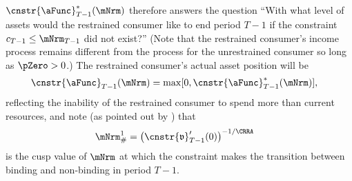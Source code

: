 \documentclass[\econtexRoot/BufferStockTheory]{subfiles}
\begin{document}
$\cnstr{\aFunc}_{T-1}^{*}(\mNrm)$ therefore answers the question ``With what level of assets would the restrained consumer like to end period $T-1$ if the constraint $c_{T-1} \leq \mNrm_{T-1}$ did not exist?''  (Note that the restrained consumer's income process remains different from the process for the unrestrained consumer so long as $\pZero>0$.)  The restrained consumer's actual asset position will be
\begin{equation}\begin{gathered}\begin{aligned}
      \cnstr{\aFunc}_{T-1}(\mNrm)  & = \max[0,\cnstr{\aFunc}^{*}_{T-1}(\mNrm)], \notag
    \end{aligned}\end{gathered}\end{equation}
reflecting the inability of the restrained consumer to spend more than current resources, and note (as pointed out by \cite{deatonLiqConstr}) that
\begin{equation}\begin{gathered}\begin{aligned}
      \mNrm^{1}_{\#}  & = {\left( \cnstr{\mathfrak{v}}_{T-1}^{\prime}(0)\right)}^{-1/\CRRA} \notag
    \end{aligned}\end{gathered}\end{equation}
is the cusp value of $\mNrm$ at which the constraint makes the
transition between binding and non-binding in period $T-1$.
\end{document}
